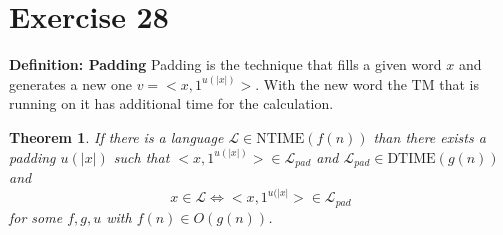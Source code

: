 \documentclass[10pt]{article}
\newcommand{\NT}{\text{NTIME}}
\newcommand{\DT}{\text{DTIME}}
\newcommand{\Ll}{\mathcal{L}}
\newtheorem{pad}{Theorem}
\begin{document}
\section*{Exercise 28}

\textbf{Definition: Padding}
Padding is the technique that fills a given word $x$ and generates a new one
$v=<x,1^{u(|x|)}>$. With the new word the TM that is running on it has additional
time for the calculation.

\begin{pad}
  If there is a language $\Ll \in \NT(f(n))$ than there exists a padding $u(|x|)$
  such that $<x,1^{u(|x|)}> \in \Ll_{pad}$ and $\Ll_{pad}\in \DT(g(n))$ and
  \begin{displaymath}
    x\in \Ll \Leftrightarrow <x,1^{u(|x|}>\in \Ll_{pad}
  \end{displaymath}
  for some $f,g,u$ with $f(n)\in O(g(n))$.
\end{pad}

 

\end{document}
